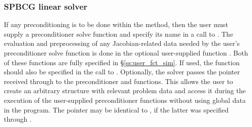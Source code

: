 \subsubsection{SPBCG linear solver}\label{sss:optin_spbcg}
If any preconditioning is to be done within the {\spbcg} method,
then the user must supply a preconditioner solve function 
and specify its name in a call to .
The evaluation and preprocessing of any Jacobian-related data needed
by the user's preconditioner solve function is done in the optional
user-supplied function . Both of these functions are
fully specified in \S\ref{ss:user_fct_sim}.
If used, the  function should also be specified in the call to
.
Optionally, the {\cvspbcg} solver passes the pointer 
received through  to the preconditioner
 and  functions.  This allows the user to create
an arbitrary structure with relevant problem data and access it during
the execution of the user-supplied preconditioner functions without using
global data in the program.  The pointer  may be identical
to , if the latter was specified through .

